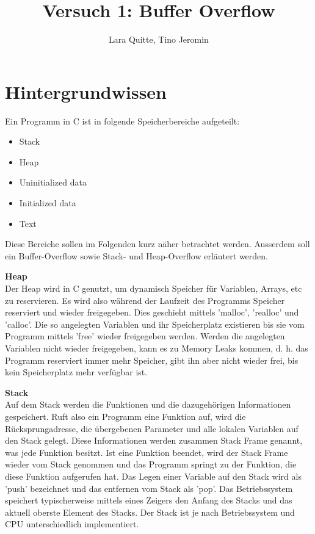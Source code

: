 \documentclass[12pt,a4paper]{article}
\date{}
\author{Lara Quitte, Tino Jeromin}
\title{Versuch 1: Buffer Overflow}
\begin{document}
	\maketitle
	
	
	\section*{Hintergrundwissen}
	Ein Programm in C ist in folgende Speicherbereiche aufgeteilt:
	\begin{itemize}
		\item Stack
		\item Heap
		\item Uninitialized data
		\item Initialized data 
		\item Text
	\end{itemize}
	
	Diese Bereiche sollen im Folgenden kurz näher betrachtet werden. Ausserdem soll ein Buffer-Overflow sowie Stack- und Heap-Overflow erläutert werden.
	\bigskip
	
	\textbf{Heap} \\
	Der Heap wird in C genutzt, um dynamisch Speicher für Variablen, Arrays, etc zu reservieren.
	Es wird also während der Laufzeit des Programms Speicher reserviert und wieder freigegeben.
	Dies geschieht mittels 'malloc', 'realloc' und 'calloc'. 
	Die so angelegten Variablen und ihr Speicherplatz existieren bis sie vom Programm mittels 'free' wieder
	freigegeben werden. Werden die angelegten Variablen nicht wieder freigegeben, kann es zu Memory Leaks
	kommen, d. h. das Programm reserviert immer mehr Speicher, gibt ihn aber nicht wieder frei, bis kein 
	Speicherplatz mehr verfügbar ist.
	\bigskip
	
	\textbf{Stack} \\
	Auf dem Stack werden die Funktionen und die dazugehörigen Informationen gespeichert.
	Ruft also ein Programm eine Funktion auf, wird die Rücksprungadresse, die übergebenen Parameter und 
	alle lokalen Variablen auf den Stack gelegt. Diese Informationen werden zusammen Stack Frame genannt, 
	was jede Funktion besitzt.
	Ist eine Funktion beendet, wird der Stack Frame wieder vom Stack genommen und das Programm springt 
	zu der Funktion, die diese Funktion aufgerufen hat.
	Das Legen einer Variable auf den Stack wird als 'push' bezeichnet und das entfernen vom Stack als 'pop'.
	Das Betriebssystem speichert typischerweise mittels eines Zeigers den Anfang des Stacks und das aktuell 
	oberste Element des Stacks.
	Der Stack ist je nach Betriebssystem und CPU unterschiedlich implementiert.
	\bigskip
	
\end{document}
